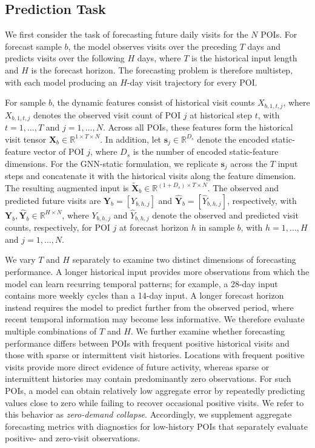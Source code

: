 \documentclass[preprint,authoryear,11pt]{elsarticle}
\theoremstyle{definition}
\begin{document}
\subsection{Prediction Task}
\label{subsec:prediction_task}

We first consider the task of forecasting future daily visits for the \(N\) POIs.
For forecast sample \(b\), the model observes visits over the preceding \(T\) days and predicts visits over the following \(H\) days, where \(T\) is the historical input length and \(H\) is the forecast horizon.
The forecasting problem is therefore multistep, with each model producing an \(H\)-day visit trajectory for every POI.

For sample \(b\), the dynamic features consist of historical visit counts \(X_{b,1,t,j}\), where \(X_{b,1,t,j}\) denotes the observed visit count of POI \(j\) at historical step \(t\), with \(t=1,\ldots,T\) and \(j=1,\ldots,N\).
Across all POIs, these features form the historical visit tensor \(\mathbf{X}_b\in\mathbb{R}^{1\times T\times N}\).
In addition, let \(\mathbf{s}_j\in\mathbb{R}^{D_s}\) denote the encoded static-feature vector of POI \(j\), where \(D_s\) is the number of encoded static-feature dimensions.
For the GNN-static formulation, we replicate \(\mathbf{s}_j\) across the \(T\) input steps and concatenate it with the historical visits along the feature dimension.
The resulting augmented input is \(\widetilde{\mathbf{X}}_b\in\mathbb{R}^{(1+D_s)\times T\times N}\).
The observed and predicted future visits are
\(\mathbf{Y}_b=[Y_{b,h,j}]\) and
\(\hat{\mathbf{Y}}_b=[\hat{Y}_{b,h,j}]\), respectively, with
\(\mathbf{Y}_b,\hat{\mathbf{Y}}_b\in\mathbb{R}^{H\times N}\),
where \(Y_{b,h,j}\) and \(\hat{Y}_{b,h,j}\) denote the observed and predicted visit counts, respectively, for POI \(j\) at forecast horizon \(h\) in sample \(b\), with \(h=1,\ldots,H\) and \(j=1,\ldots,N\).

We vary \(T\) and \(H\) separately to examine two distinct dimensions of forecasting performance.
A longer historical input provides more observations from which the model can learn recurring temporal patterns; for example, a 28-day input contains more weekly cycles than a 14-day input.
A longer forecast horizon instead requires the model to predict further from the observed period, where recent temporal information may become less informative.
We therefore evaluate multiple combinations of \(T\) and \(H\).
We further examine whether forecasting performance differs between POIs with frequent positive historical visits and those with sparse or intermittent visit histories.
Locations with frequent positive visits provide more direct evidence of future activity, whereas sparse or intermittent histories may contain predominantly zero observations.
For such POIs, a model can obtain relatively low aggregate error by repeatedly predicting values close to zero while failing to recover occasional positive visits.
We refer to this behavior as \textit{zero-demand collapse}.
Accordingly, we supplement aggregate forecasting metrics with diagnostics for low-history POIs that separately evaluate positive- and zero-visit observations.
\end{document}
